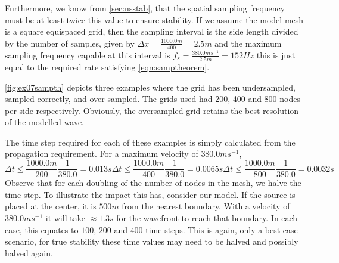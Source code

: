 Furthermore, we know from \autoref{sec:nsstab}, that the spatial sampling
frequency must be at least twice this value to ensure stability. If we assume
the model mesh is a square equispaced grid,
then the sampling interval is the side length divided by the number of samples,
given by $\Delta x = \frac{1000.0m}{400} = 2.5m$ and the maximum sampling
frequency capable at this interval is
$f_{s}=\frac{380.0ms^{-1}}{2.5m}=152Hz$ this is just equal to the
required rate satisfying \autoref{eqn:samptheorem}. 

\autoref{fig:ex07sampth} depicts three examples where the grid has been
undersampled, sampled correctly, and over sampled. The grids used had
200, 400 and 800 nodes per side respectively. Obviously, the oversampled grid
retains the best resolution of the modelled wave.

The time step required for each of these examples is simply calculated from
the propagation requirement. For a maximum velocity of $380.0ms^{-1}$,
\begin{subequations}
 \begin{equation}
  \Delta t \leq \frac{1000.0m}{200} \frac{1}{380.0} = 0.013s
 \end{equation}
 \begin{equation}
  \Delta t \leq \frac{1000.0m}{400} \frac{1}{380.0} = 0.0065s
 \end{equation}
 \begin{equation}
  \Delta t \leq \frac{1000.0m}{800} \frac{1}{380.0} = 0.0032s
 \end{equation}
\end{subequations}
Observe that for each doubling of the number of nodes in the mesh, we halve
the time step. To illustrate the impact this has, consider our model. If the
source is placed at the center, it is $500m$ from the nearest boundary. With a
velocity of $380.0ms^{-1}$ it will take $\approx1.3s$ for the wavefront to
reach that boundary. In each case, this equates to $100$,  $200$ and $400$ time
steps. This is again, only a best case scenario, for true stability these time
values may need to be halved and possibly halved again.

